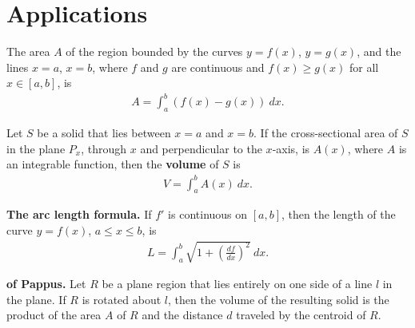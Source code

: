 \documentclass{article}
\begin{document}
\section{Applications}
\begin{definition}
    The area $A$ of the region bounded by the curves $y=f(x)$, $y=g(x)$, and the lines $x=a$, $x=b$, where $f$ and $g$ are continuous and $f(x)\geq g(x)$ for all $x\in[a,b]$, is
    \begin{align*}
        A=\int_a^b \left(f(x)-g(x)\right)\:dx.
    \end{align*}
\end{definition}
\begin{definition}
    Let $S$ be a solid that lies between $x=a$ and $x=b$. If the cross-sectional area of $S$ in the plane $P_x$, through $x$ and perpendicular to the $x$-axis, is $A(x)$, where $A$ is an integrable function, then the \textbf{volume} of $S$ is
    \begin{align*}
        V=\int_a^b A(x)\:dx.
    \end{align*}
\end{definition}
\begin{theorem}
    \textbf{The arc length formula.} If $f'$ is continuous on $[a,b]$, then the length of the curve $y=f(x)$, $a\leq x \leq b$, is
    \begin{align*}
        L = \int_a^b \sqrt{1+\left(\frac{df}{dx}\right)^2}\:dx.
    \end{align*}
\end{theorem}
\begin{theorem}
    \textbf{of Pappus.} Let $R$ be a plane region that lies entirely on one side of a line $l$ in the plane.
    If $R$ is rotated about $l$, then the volume of the resulting solid is the product of the area $A$ of $R$ and the distance $d$ traveled by the centroid of $R$.
\end{theorem}
\end{document}
